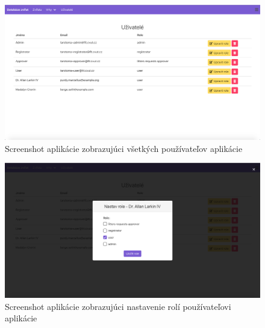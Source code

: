 \begin{figure}[H]
	\includegraphics[width=1.0\textwidth]{media/priloha/pouzivatelia/1.png}
	\caption{Screenshot aplikácie zobrazujúci všetkých používateľov aplikácie}
\end{figure}

\vspace*{\fill}

\begin{figure}[H]
	\includegraphics[width=1.0\textwidth]{media/priloha/pouzivatelia/2.png}
	\caption{Screenshot aplikácie zobrazujúci nastavenie rolí používateľovi aplikácie}
\end{figure}

